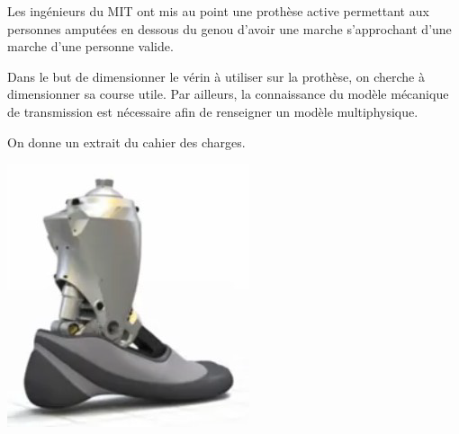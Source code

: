 \documentclass[10pt]{article}
\begin{document}
\begin{minipage}[c]{.8\linewidth}
Les ingénieurs du MIT ont mis au point une prothèse active permettant aux personnes amputées en dessous du genou d'avoir une marche s'approchant d'une marche d'une personne valide. 
\begin{obj} 
Dans le but de dimensionner le vérin à utiliser sur la prothèse, on cherche à dimensionner sa course utile. Par ailleurs, la connaissance du modèle mécanique de transmission est nécessaire afin de renseigner un modèle multiphysique. 
\end{obj}

 On donne un extrait du cahier des charges.
 
\end{minipage} \hfill
\begin{minipage}[c]{.15\linewidth}
\begin{center}
\includegraphics[width=\textwidth]{images/prot_01}
\end{center}
\end{minipage}
\end{document}
